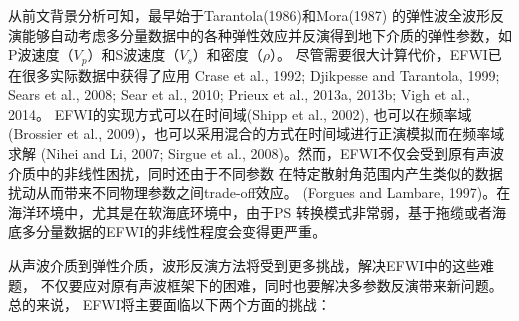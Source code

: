 从前文背景分析可知，最早始于Tarantola(1986)\cite{tarantola:1986}和Mora(1987)\cite{mora:1987}
的弹性波全波形反演能够自动考虑多分量数据中的各种弹性效应并反演得到地下介质的弹性参数，如P波速度（$V_p$）和S波速度（$V_s$）和密度（$\rho$）。
尽管需要很大计算代价，EFWI已在很多实际数据中获得了应用
Crase et al., 1992\cite{crase1992nonlinear}; Djikpesse and Tarantola,
1999\cite{djikpesse.tarantola:1999}; Sears et al., 2008\cite{sears2008}; Sear et al.,
2010\cite{sears:2010}; Prieux et al., 2013a\cite{prieux:2013a}, 2013b\cite{prieux:2013b}; Vigh et al.,
2014\cite{vigh:2014}。
EFWI的实现方式可以在时间域(Shipp et al., 2002\cite{shipp:2002}),
也可以在频率域(Brossier et al., 2009\cite{brossier2009})，也可以采用混合的方式在时间域进行正演模拟而在频率域求解
(Nihei and Li, 2007\cite{nihei.li:2007}; Sirgue et al.,
2008\cite{sirgue:2008})。然而，EFWI不仅会受到原有声波介质中的非线性困扰，同时还由于不同参数
在特定散射角范围内产生类似的数据扰动从而带来不同物理参数之间trade-off效应。
(Forgues and Lambare, 1997\cite{forgues.lambare:1997})。在海洋环境中，尤其是在软海底环境中，由于PS
转换模式非常弱，基于拖缆或者海底多分量数据的EFWI的非线性程度会变得更严重\cite{sears2008}。

从声波介质到弹性介质，波形反演方法将受到更多挑战，解决EFWI中的这些难题，
不仅要应对原有声波框架下的困难，同时也要解决多参数反演带来新问题。总的来说，
EFWI将主要面临以下两个方面的挑战：

